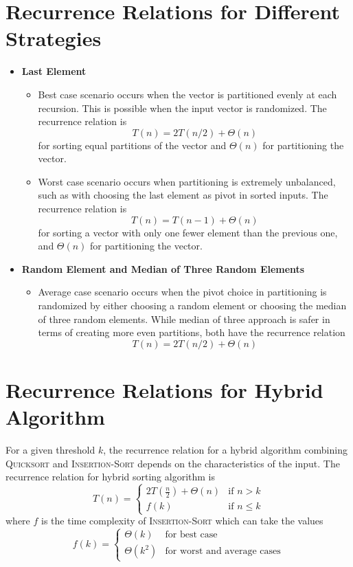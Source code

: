\label{Recurrence}
\section{Recurrence Relations for Different Strategies}
\begin{itemize}
    \item \textbf{Last Element}
    \begin{itemize}
        \item Best case scenario occurs when the vector is partitioned evenly at each recursion. This is possible when the input vector is randomized. The recurrence relation is $$T(n) = 2T(n/2) + \Theta(n)$$ for sorting equal partitions of the vector and $\Theta(n)$ for partitioning the vector.
        \item Worst case scenario occurs when partitioning is extremely unbalanced, such as with choosing the last element as pivot in sorted inputs. The recurrence relation is $$T(n) = T(n-1) + \Theta(n)$$ for sorting a vector with only one fewer element than the previous one, and $\Theta(n)$ for partitioning the vector.
    \end{itemize}
    \item \textbf{Random Element and Median of Three Random Elements}
    \begin{itemize}
        \item Average case scenario occurs when the pivot choice in partitioning is randomized by either choosing a random element or choosing the median of three random elements. While median of three approach is safer in terms of creating more even partitions, both have the recurrence relation $$T(n) = 2T(n/2) + \Theta(n)$$
    \end{itemize}
\end{itemize}
\section{Recurrence Relations for Hybrid Algorithm}
For a given threshold $k$, the recurrence relation for a hybrid algorithm combining \textsc{Quicksort} and \textsc{Insertion-Sort} depends on the characteristics of the input. The recurrence relation for hybrid sorting algorithm is
\[
T(n)=
\begin{cases}
    2T(\frac{n}{2}) + \Theta(n) & \text{if } n > k \\
    f(k)                        & \text{if } n \leq k
\end{cases}
\]
where $f$ is the time complexity of \textsc{Insertion-Sort} which can take the values
\[
f(k)=
\begin{cases}
     \Theta(k)      & \text{for best case}\\
     \Theta(k^2)    & \text{for worst and average cases}
\end{cases}
\]